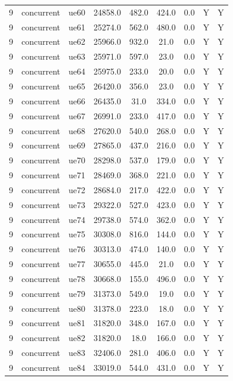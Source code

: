 \begin{table}[ht]
\begin{tabular}{|c|c|c|c|c|c|c|c|c|}
9 & concurrent & ue60 & 24858.0 & 482.0 & 424.0 & 0.0 & Y & Y \\
9 & concurrent & ue61 & 25274.0 & 562.0 & 480.0 & 0.0 & Y & Y \\
9 & concurrent & ue62 & 25966.0 & 932.0 & 21.0 & 0.0 & Y & Y \\
9 & concurrent & ue63 & 25971.0 & 597.0 & 23.0 & 0.0 & Y & Y \\
9 & concurrent & ue64 & 25975.0 & 233.0 & 20.0 & 0.0 & Y & Y \\
9 & concurrent & ue65 & 26420.0 & 356.0 & 23.0 & 0.0 & Y & Y \\
9 & concurrent & ue66 & 26435.0 & 31.0 & 334.0 & 0.0 & Y & Y \\
9 & concurrent & ue67 & 26991.0 & 233.0 & 417.0 & 0.0 & Y & Y \\
9 & concurrent & ue68 & 27620.0 & 540.0 & 268.0 & 0.0 & Y & Y \\
9 & concurrent & ue69 & 27865.0 & 437.0 & 216.0 & 0.0 & Y & Y \\
9 & concurrent & ue70 & 28298.0 & 537.0 & 179.0 & 0.0 & Y & Y \\
9 & concurrent & ue71 & 28469.0 & 368.0 & 221.0 & 0.0 & Y & Y \\
9 & concurrent & ue72 & 28684.0 & 217.0 & 422.0 & 0.0 & Y & Y \\
9 & concurrent & ue73 & 29322.0 & 527.0 & 423.0 & 0.0 & Y & Y \\
9 & concurrent & ue74 & 29738.0 & 574.0 & 362.0 & 0.0 & Y & Y \\
9 & concurrent & ue75 & 30308.0 & 816.0 & 144.0 & 0.0 & Y & Y \\
9 & concurrent & ue76 & 30313.0 & 474.0 & 140.0 & 0.0 & Y & Y \\
9 & concurrent & ue77 & 30655.0 & 445.0 & 21.0 & 0.0 & Y & Y \\
9 & concurrent & ue78 & 30668.0 & 155.0 & 496.0 & 0.0 & Y & Y \\
9 & concurrent & ue79 & 31373.0 & 549.0 & 19.0 & 0.0 & Y & Y \\
9 & concurrent & ue80 & 31378.0 & 223.0 & 18.0 & 0.0 & Y & Y \\
9 & concurrent & ue81 & 31820.0 & 348.0 & 167.0 & 0.0 & Y & Y \\
9 & concurrent & ue82 & 31820.0 & 18.0 & 166.0 & 0.0 & Y & Y \\
9 & concurrent & ue83 & 32406.0 & 281.0 & 406.0 & 0.0 & Y & Y \\
9 & concurrent & ue84 & 33019.0 & 544.0 & 431.0 & 0.0 & Y & Y \\

\end{tabular}
\end{table}
